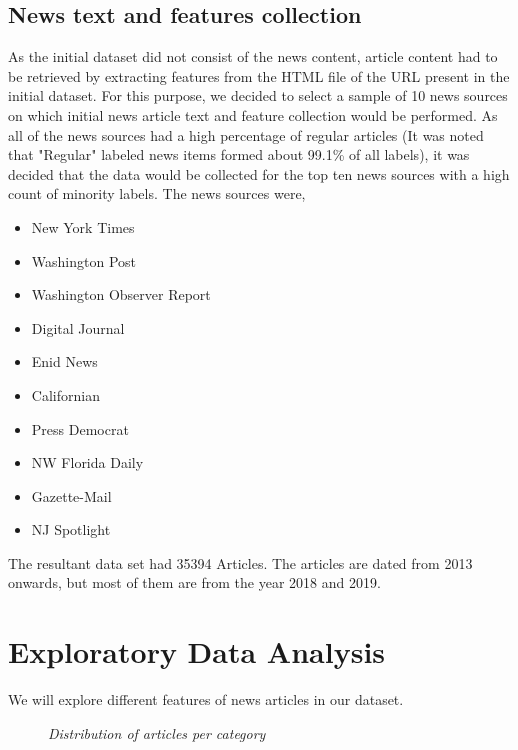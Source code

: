 \documentclass[11pt]{article}
\begin{document}
\subsection{News text and features collection} 


As the initial dataset did not consist of the news content, article content had to be retrieved by extracting features from the HTML file of the URL present in the initial dataset. For this purpose, we decided to select a sample of 10 news sources on which initial news article text and feature collection would be performed. As all of the news sources had a high percentage of regular articles (It was noted that "Regular" labeled news items formed about 99.1\% of all labels), it was decided that the data would be collected for the top ten news sources with a high count of minority labels. The news sources were, 


\begin{itemize}
  \setlength\itemsep{-0.25em}
  \item New York Times
  \item Washington Post
  \item Washington Observer Report
  \item Digital Journal
  \item Enid News
  \item Californian
  \item Press Democrat
  \item NW Florida Daily
  \item Gazette-Mail
  \item NJ Spotlight
\end{itemize}

The resultant data set had 35394 Articles. The articles are dated from 2013 onwards, but most of them are from the year 2018 and 2019.
\section{Exploratory Data Analysis}
\label{sec:eda}

We will explore different features of news articles in our dataset.

\begin{figure}[!htb]
\caption{\label{fig:d1}  \textit{Distribution of articles per category}}
\end{figure}
\end{document}
